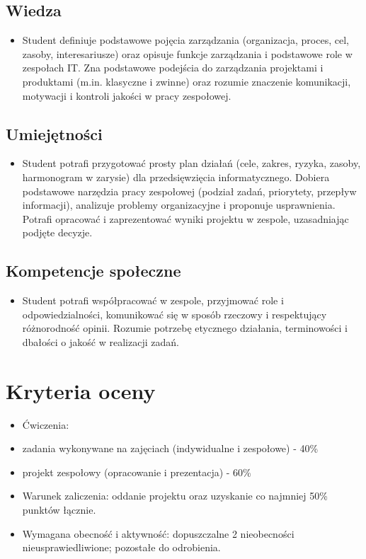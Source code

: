 \documentclass[12pt, a4paper]{article}
\begin{document}
\subsection*{Wiedza}
\begin{itemize}
  \item Student definiuje podstawowe pojęcia zarządzania (organizacja, proces, cel, zasoby, interesariusze) oraz opisuje funkcje zarządzania i podstawowe role w zespołach IT. Zna podstawowe podejścia do zarządzania projektami i produktami (m.in. klasyczne i zwinne) oraz rozumie znaczenie komunikacji, motywacji i kontroli jakości w pracy zespołowej.
\end{itemize}

\subsection*{Umiejętności}
\begin{itemize}
  \item Student potrafi przygotować prosty plan działań (cele, zakres, ryzyka, zasoby, harmonogram w zarysie) dla przedsięwzięcia informatycznego. Dobiera podstawowe narzędzia pracy zespołowej (podział zadań, priorytety, przepływ informacji), analizuje problemy organizacyjne i proponuje usprawnienia. Potrafi opracować i zaprezentować wyniki projektu w zespole, uzasadniając podjęte decyzje.
\end{itemize}

\subsection*{Kompetencje społeczne}
\begin{itemize}
  \item Student potrafi współpracować w zespole, przyjmować role i odpowiedzialności, komunikować się w sposób rzeczowy i respektujący różnorodność opinii. Rozumie potrzebę etycznego działania, terminowości i dbałości o jakość w realizacji zadań.
\end{itemize}

\section{Kryteria oceny}

\begin{itemize}
  \item Ćwiczenia:
  \item zadania wykonywane na zajęciach (indywidualne i zespołowe) - 40\%
  \item projekt zespołowy (opracowanie i prezentacja) - 60\%
  \item Warunek zaliczenia: oddanie projektu oraz uzyskanie co najmniej 50\% punktów łącznie.
  \item Wymagana obecność i aktywność: dopuszczalne 2 nieobecności nieusprawiedliwione; pozostałe do odrobienia.
\end{itemize}
\end{document}
